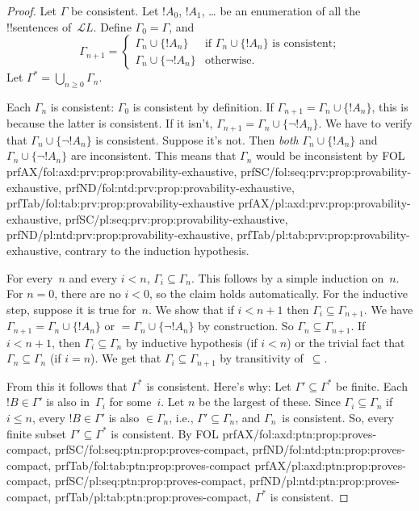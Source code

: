 \documentclass[10pt,a4paper]{article}
\theoremstyle{plain}
\theoremstyle{definition}
\theoremstyle{remark}
\providecommand{\Lang}{\ensuremath{\mathcal{L}}}
\providecommand{\iftag}[1]{#1}
\providecommand{\tagrefs}[1]{#1}
\begin{document}
\begin{proof}
Let $\Gamma$ be consistent.  Let $!A_0$, $!A_1$,
\dots{} be an enumeration of all the !!{sentence}s of~$\Lang L$.
Define $\Gamma_0 = \Gamma$, and
\[
\Gamma_{n+1} =
\begin{cases}
\Gamma_n \cup \{ !A_n \} & \textrm{if $\Gamma_n \cup \{!A_n\}$ is
  consistent;} \\
\Gamma_n \cup \{ \lnot !A_n \} & \textrm{otherwise.}
\end{cases}
\]
Let $\Gamma^* = \bigcup_{n \geq 0} \Gamma_n$.

Each $\Gamma_n$ is consistent: $\Gamma_0$ is consistent by definition.
If $\Gamma_{n+1} = \Gamma_n \cup \{!A_n\}$, this is because the latter
is consistent.  If it isn't, $\Gamma_{n+1} = \Gamma_n \cup \{\lnot
!A_n\}$. We have to verify that $\Gamma_n \cup \{\lnot !A_n\}$ is
consistent. Suppose it's not. Then \emph{both} $\Gamma_n \cup
\{!A_n\}$ and $\Gamma_n \cup \{\lnot !A_n\}$ are inconsistent.  This
means that $\Gamma_n$ would be inconsistent by
\iftag{FOL}{%
  \tagrefs{prfAX/{fol:axd:prv:prop:provability-exhaustive},
    prfSC/{fol:seq:prv:prop:provability-exhaustive},
    prfND/{fol:ntd:prv:prop:provability-exhaustive},
    prfTab/{fol:tab:prv:prop:provability-exhaustive}}}{%
  \tagrefs{prfAX/{pl:axd:prv:prop:provability-exhaustive},
    prfSC/{pl:seq:prv:prop:provability-exhaustive},
    prfND/{pl:ntd:prv:prop:provability-exhaustive},
    prfTab/{pl:tab:prv:prop:provability-exhaustive}}},
contrary to the induction hypothesis.

For every~$n$ and every $i < n$, $\Gamma_i \subseteq \Gamma_n$. This
follows by a simple induction on~$n$. For $n=0$, there are no $i < 0$,
so the claim holds automatically.  For the inductive step, suppose it
is true for~$n$. We show that if $i < n+1$ then $\Gamma_i \subseteq
\Gamma_{n+1}$. We have $\Gamma_{n+1} = \Gamma_n \cup \{!A_n\}$ or $=
\Gamma_n \cup \{\lnot !A_n\}$ by construction. So $\Gamma_n \subseteq
\Gamma_{n+1}$. If $i < n+1$, then $\Gamma_i \subseteq \Gamma_n$ by
inductive hypothesis (if $i < n$) or the trivial fact that $\Gamma_n
\subseteq \Gamma_n$ (if $i = n$). We get that $\Gamma_i \subseteq
\Gamma_{n+1}$ by transitivity of~$\subseteq$.

From this it follows that $\Gamma^*$ is consistent. Here's why: Let
$\Gamma' \subseteq \Gamma^*$ be finite. Each $!B \in \Gamma'$ is also
in~$\Gamma_i$ for some~$i$. Let $n$ be the largest of these. Since
$\Gamma_i \subseteq \Gamma_n$ if $i \le n$, every $!B \in \Gamma'$ is
also $\in \Gamma_n$, i.e., $\Gamma' \subseteq \Gamma_n$, and
$\Gamma_n$~is consistent. So, every finite subset $\Gamma' \subseteq
\Gamma^*$ is consistent. By \iftag{FOL}{%
  \tagrefs{prfAX/{fol:axd:ptn:prop:proves-compact},
    prfSC/{fol:seq:ptn:prop:proves-compact},
    prfND/{fol:ntd:ptn:prop:proves-compact},
    prfTab/{fol:tab:ptn:prop:proves-compact}}}{%
  \tagrefs{prfAX/{pl:axd:ptn:prop:proves-compact},
    prfSC/{pl:seq:ptn:prop:proves-compact},
    prfND/{pl:ntd:ptn:prop:proves-compact},
    prfTab/{pl:tab:ptn:prop:proves-compact}}}, $\Gamma^*$ is
  consistent.


\end{proof}
\end{document}
